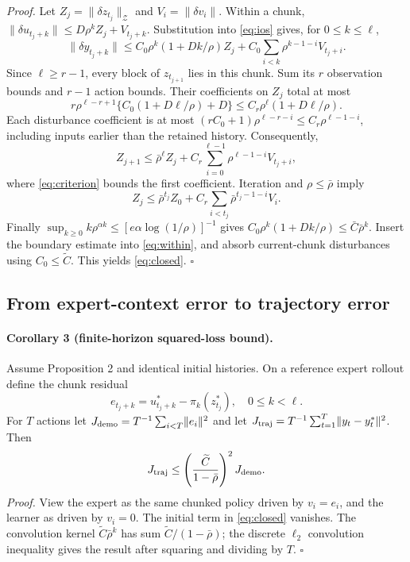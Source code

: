 \documentclass{l4dc2026}
\newcommand{\norm}[1]{\lVert#1\rVert}
\begin{document}
\emph{Proof.} Let $Z_j=\norm{\delta z_{t_j}}_{\mathcal Z}$ and $V_i=\norm{\delta v_i}$. Within a chunk,
$\norm{\delta u_{t_j+k}}\le D\rho^kZ_j+V_{t_j+k}$. Substitution into \eqref{eq:ios} gives, for $0\le k\le\ell$,
\begin{equation}\label{eq:within}
\norm{\delta y_{t_j+k}}\le C_0\rho^k(1+Dk/\rho)Z_j
+C_0\sum_{i<k}\rho^{k-1-i}V_{t_j+i}.
\end{equation}
Since $\ell\ge r-1$, every block of $z_{t_{j+1}}$ lies in this chunk. Sum its $r$ observation bounds and $r-1$ action bounds. Their coefficients on $Z_j$ total at most
\[
r\rho^{\ell-r+1}\{C_0(1+D\ell/\rho)+D\}
\le C_r\rho^\ell(1+D\ell/\rho).
\]
Each disturbance coefficient is at most $(rC_0+1)\rho^{\ell-r-i}\le C_r\rho^{\ell-1-i}$, including inputs earlier than the retained history. Consequently,
\[
Z_{j+1}\le\bar\rho^\ell Z_j+
C_r\sum_{i=0}^{\ell-1}\rho^{\ell-1-i}V_{t_j+i},
\]
where \eqref{eq:criterion} bounds the first coefficient. Iteration and $\rho\le\bar\rho$ imply
\[
Z_j\le\bar\rho^{t_j}Z_0+
C_r\sum_{i<t_j}\bar\rho^{t_j-1-i}V_i.
\]
Finally $\sup_{k\ge0}k\rho^{\alpha k}\le[e\alpha\log(1/\rho)]^{-1}$ gives
$C_0\rho^k(1+Dk/\rho)\le\bar C\bar\rho^k$.
Insert the boundary estimate into \eqref{eq:within}, and absorb current-chunk disturbances using $C_0\le\widetilde C$. This yields \eqref{eq:closed}. $\square$

\subsection{From expert-context error to trajectory error}
\paragraph{Corollary 3 (finite-horizon squared-loss bound).}
Assume Proposition 2 and identical initial histories. On a reference expert rollout define the chunk residual
\[
e_{t_j+k}=u^*_{t_j+k}-\pi_k(z^*_{t_j}),\quad 0\le k<\ell.
\]
For $T$ actions let $J_{\rm demo}=T^{-1}\sum_{i<T}\norm{e_i}^2$ and let $J_{\rm traj}=T^{-1}\sum_{t=1}^T\norm{y_t-y_t^*}^2$. Then
\[
J_{\rm traj}\le
\left(\frac{\widetilde C}{1-\bar\rho}\right)^2J_{\rm demo}.
\]
\emph{Proof.} View the expert as the same chunked policy driven by $v_i=e_i$, and the learner as driven by $v_i=0$. The initial term in \eqref{eq:closed} vanishes. The convolution kernel $\widetilde C\bar\rho^k$ has sum $\widetilde C/(1-\bar\rho)$; the discrete $\ell_2$ convolution inequality gives the result after squaring and dividing by $T$. $\square$
\end{document}
